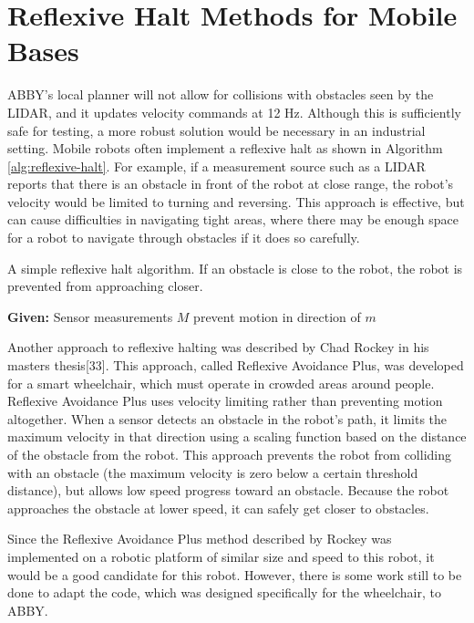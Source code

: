 \documentclass[]{cwru} %
\begin{document}
\section{Reflexive Halt Methods for Mobile Bases}

ABBY's local planner will not allow for collisions with obstacles seen
by the LIDAR, and it updates velocity commands at 12 Hz. Although this
is sufficiently safe for testing, a more robust solution would be
necessary in an industrial setting. Mobile robots often implement a
reflexive halt as shown in Algorithm \ref{alg:reflexive-halt}. For example,
if a measurement source such as a LIDAR reports that there is an obstacle in 
front of the robot at close range, the robot's velocity would be limited to 
turning and reversing. This approach is effective, but can cause difficulties 
in navigating tight areas, where there may be enough space for a robot to
navigate through obstacles if it does so carefully.

\begin{algorithm}
\caption{A simple reflexive halt
algorithm. If an obstacle is close to the robot, the robot is prevented
from approaching closer.}
\label{alg:reflexive-halt}
\begin{algorithmic}
\STATE \textbf{Given:} Sensor measurements $M$
    \STATE prevent motion in direction of $m$
  \ENDIF
\ENDFOR
\end{algorithmic}
\end{algorithm}

Another approach to reflexive halting was described by Chad Rockey in
his masters thesis{[}33{]}. This approach, called Reflexive Avoidance
Plus, was developed for a smart wheelchair, which must operate in
crowded areas around people. Reflexive Avoidance Plus uses velocity
limiting rather than preventing motion altogether. When a sensor detects
an obstacle in the robot's path, it limits the maximum velocity in that
direction using a scaling function based on the distance of the obstacle
from the robot. This approach prevents the robot from colliding with an
obstacle (the maximum velocity is zero below a certain threshold
distance), but allows low speed progress toward an obstacle. Because the
robot approaches the obstacle at lower speed, it can safely get closer
to obstacles.

Since the Reflexive Avoidance Plus method described by Rockey was
implemented on a robotic platform of similar size and speed to this
robot, it would be a good candidate for this robot. However, there is
some work still to be done to adapt the code, which was designed
specifically for the wheelchair, to ABBY.
\end{document}
